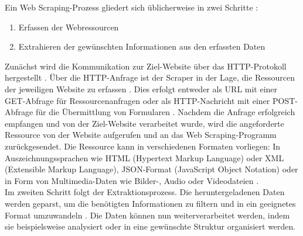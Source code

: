 \documentclass[german,bachelor]{swsLeipzig}
\begin{document}
\noindent Ein Web Scraping-Prozess gliedert sich üblicherweise in zwei Schritte \cite[]{zhao2017web}:
\begin{enumerate}
 \item Erfassen der Webressourcen
 \item Extrahieren der gewünschten Informationen aus den erfassten Daten
\end{enumerate}
Zunächst wird die Kommunikation zur Ziel-Website über das HTTP-Protokoll hergestellt \cite[]{10.1093/bib/bbt026}.
Über die HTTP-Anfrage ist der Scraper in der Lage, die Ressourcen der jeweiligen Website zu erfassen \cite[]{zhao2017web}.
Dies erfolgt entweder als URL mit einer GET-Abfrage für Ressourcenanfragen oder als HTTP-Nachricht mit einer
POST-Abfrage für die Übermittlung von Formularen \cite[]{10.1093/bib/bbt026}.
Nachdem die Anfrage erfolgreich empfangen und von der Ziel-Website verarbeitet wurde, wird die angeforderte Ressource
von der Website aufgerufen und an das Web Scraping-Programm zurückgesendet.
Die Ressource kann in verschiedenen Formaten vorliegen:
In Auszeichnungssprachen wie HTML (Hypertext Markup Language) oder XML (Extensible Markup Language), JSON-Format
(JavaScript Object Notation) oder in Form von Multimedia-Daten wie Bilder-, Audio oder Videodateien \cite[]{zhao2017web}.\\
\indent Im zweiten Schritt folgt der Extraktionsprozess.
Die heruntergeladenen Daten werden geparst, um die benötigten Informationen zu filtern und in ein geeignetes Format
umzuwandeln \cite[]{10.1093/bib/bbt026}.
Die Daten können nun weiterverarbeitet werden, indem sie beispielsweise analysiert oder in eine gewünschte Struktur
organisiert werden.\\
\end{document}
